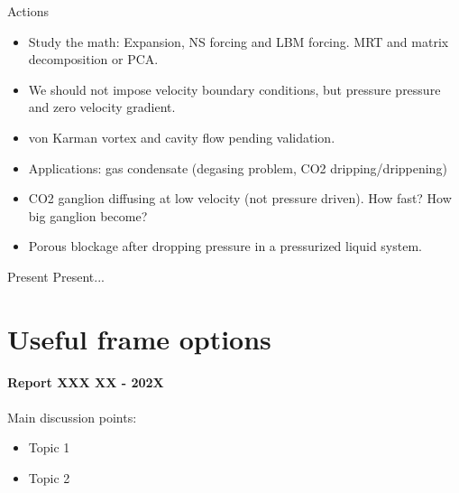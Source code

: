 \documentclass{beamer}
\begin{document}
	\begin{frame}{Actions}
		\begin{itemize}
			\item Study the math: Expansion, NS forcing and LBM forcing. MRT and matrix decomposition or PCA.
			\item We should not impose velocity boundary conditions, but pressure pressure and zero velocity gradient. 
			\item von Karman vortex and cavity flow pending validation.
			\item Applications: gas condensate (degasing problem, CO2 dripping/drippening)
			\item CO2 ganglion diffusing at low velocity (not pressure driven). How fast? How big ganglion become?
			\item Porous blockage after dropping pressure in a pressurized liquid system. 
		\end{itemize}
	\end{frame}
	
	
	\begin{frame}{Present}
		Present...
	\end{frame}
	
	\section*{Useful frame options}
	\begin{frame}
		\textbf{Report XXX XX - 202X}\\~\\
		Main discussion points:
		\begin{itemize}
			\item Topic 1
			\item Topic 2
		\end{itemize}
	\end{frame}
\end{document}
